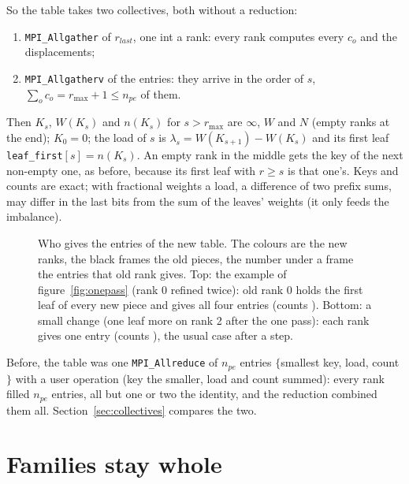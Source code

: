 \documentclass[10pt,a4paper]{article}
\theoremstyle{definition}
\newcommand{\fn}[1]{\texttt{#1}}
\begin{document}
So the table takes two collectives, both without a reduction:
\begin{enumerate}
  \item \fn{MPI\_Allgather} of $r_{last}$, one int a rank: every rank
    computes every $c_o$ and the displacements;
  \item \fn{MPI\_Allgatherv} of the entries: they arrive in the order of
    $s$, $\sum_o c_o = r_{\max} + 1 \le n_{pe}$ of them.
\end{enumerate}
Then $K_s$, $W(K_s)$ and $n(K_s)$ for $s > r_{\max}$ are $\infty$, $W$
and $N$ (empty ranks at the end); $K_0 = 0$; the load of $s$ is
$\lambda_s = W(K_{s+1}) - W(K_s)$ and its first leaf
\fn{leaf\_first}$[s] = n(K_s)$. An empty rank in the middle gets the key
of the next non-empty one, as before, because its first leaf with $r \ge
s$ is that one's. Keys and counts are exact; with fractional weights a
load, a difference of two prefix sums, may differ in the last bits from
the sum of the leaves' weights (it only feeds the imbalance).

\begin{figure}[h]
  \centering
  \begin{tikzpicture}[x=1cm, y=1cm]\end{tikzpicture}
  \caption{Who gives the entries of the new table. The colours are the new
    ranks, the black frames the old pieces, the number under a frame the
    entries that old rank gives. Top: the example of
    figure~\ref{fig:onepass} (rank 0 refined twice): old rank 0 holds the
    first leaf of every new piece and gives all four entries (counts
    \entbig). Bottom: a small change (one leaf more on rank 2 after the
    one pass): each rank gives one entry (counts \entsmall), the usual
    case after a step.}
  \label{fig:entries}
\end{figure}

Before, the table was one \fn{MPI\_Allreduce} of $n_{pe}$ entries
$\{$smallest key, load, count$\}$ with a user operation (key the
smaller, load and count summed): every rank filled $n_{pe}$ entries, all
but one or two the identity, and the reduction combined them all.
Section~\ref{sec:collectives} compares the two.

\section{Families stay whole}
\end{document}
